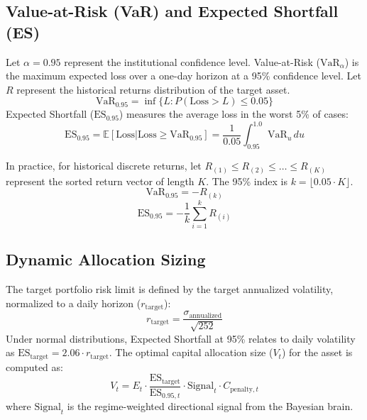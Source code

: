 \documentclass[11pt,a4paper]{article}
\begin{document}
\subsection{Value-at-Risk (VaR) and Expected Shortfall (ES)}

Let $\alpha = 0.95$ represent the institutional confidence level. Value-at-Risk ($\text{VaR}_{\alpha}$) is the maximum expected loss over a one-day horizon at a 95\% confidence level. Let $R$ represent the historical returns distribution of the target asset.
\begin{equation}
    \text{VaR}_{0.95} = \inf \{ L : P(\text{Loss} > L) \le 0.05 \}
\end{equation}
Expected Shortfall ($\text{ES}_{0.95}$) measures the average loss in the worst 5\% of cases:
\begin{equation}
    \text{ES}_{0.95} = \mathbb{E}[ \text{Loss} | \text{Loss} \ge \text{VaR}_{0.95} ] = \frac{1}{0.05} \int_{0.95}^{1.0} \text{VaR}_u \, du
\end{equation}

In practice, for historical discrete returns, let $R_{(1)} \le R_{(2)} \le \dots \le R_{(K)}$ represent the sorted return vector of length $K$. The 95\% index is $k = \lfloor 0.05 \cdot K \rfloor$.
\begin{equation}
    \text{VaR}_{0.95} = -R_{(k)}
\end{equation}
\begin{equation}
    \text{ES}_{0.95} = -\frac{1}{k} \sum_{i=1}^k R_{(i)}
\end{equation}

\subsection{Dynamic Allocation Sizing}

The target portfolio risk limit is defined by the target annualized volatility, normalized to a daily horizon ($r_{\text{target}}$):
\begin{equation}
    r_{\text{target}} = \frac{\sigma_{\text{annualized}}}{\sqrt{252}}
\end{equation}
Under normal distributions, Expected Shortfall at 95\% relates to daily volatility as $\text{ES}_{\text{target}} = 2.06 \cdot r_{\text{target}}$. The optimal capital allocation size ($V_t$) for the asset is computed as:
\begin{equation}
    V_t = E_t \cdot \frac{\text{ES}_{\text{target}}}{\text{ES}_{0.95, t}} \cdot \text{Signal}_t \cdot C_{\text{penalty}, t}
\end{equation}
where $\text{Signal}_t$ is the regime-weighted directional signal from the Bayesian brain.
\end{document}
